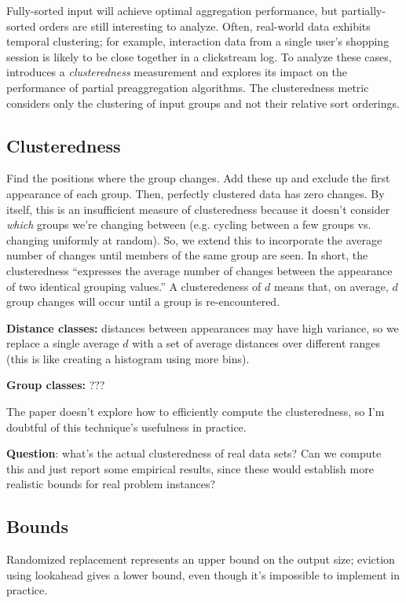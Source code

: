 \documentclass[12pt]{article}
\begin{document}
Fully-sorted input will achieve optimal aggregation performance, but partially-sorted orders are still interesting to analyze.  Often, real-world data exhibits temporal clustering; for example, interaction data from a single user's shopping session is likely to be close together in a clickstream log.  To analyze these cases, \cite{estimating-cardinality} introduces a \emph{clusteredness} measurement and explores its impact on the performance of partial preaggregation algorithms.  The clusteredness metric considers only the clustering of input groups and not their relative sort orderings.

\subsection{Clusteredness}

Find the positions where the group changes.  Add these up and exclude the first appearance of each group.  Then, perfectly clustered data has zero changes.  By itself, this is an insufficient measure of clusteredness because it doesn't consider \emph{which} groups we're changing between (e.g. cycling between a few groups vs. changing uniformly at random).  So, we extend this to incorporate the average number of changes until members of the same group are seen.  In short, the clusteredness ``expresses the average number of changes between the appearance of two identical grouping values.''  A clusteredeness of $d$ means that, on average, $d$ group changes will occur until a group is re-encountered.


\textbf{Distance classes:} distances between appearances may have high variance, so we replace a single average $d$ with a set of average distances over different ranges (this is like creating a histogram using more bins).

\textbf{Group classes:} ???

The paper doesn't explore how to efficiently compute the clusteredness, so I'm doubtful of this technique's usefulness in practice.

\textbf{Question}: what's the actual clusteredness of real data sets?  Can we compute this and just report some empirical results, since these would establish more realistic bounds for real problem instances?

\subsection{Bounds}

\cite{estimating-cardinality}
Randomized replacement represents an upper bound on the output size; eviction using lookahead gives a lower bound, even though it's impossible to implement in practice.




\end{document}
